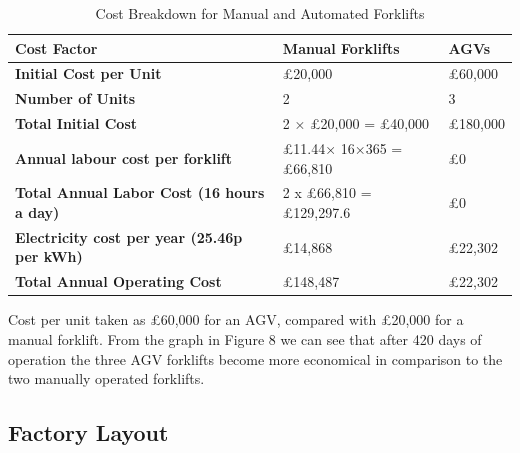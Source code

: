 \documentclass[12pt]{article}
\begin{document}
\begin{table}[htbp]
\centering
\begin{tabular}{|l|l|l|}
\hline
\textbf{Cost Factor}                   & \textbf{Manual Forklifts}           & \textbf{AGVs } \\ \hline
\textbf{Initial Cost per Unit}          & £20,000                             & £60,000                               \\ \hline
\textbf{Number of Units}                & 2                                    & 3                                     \\ \hline
\textbf{Total Initial Cost}             & 2 × £20,000 = £40,000               & £180,000                \\ \hline
\textbf{Annual labour cost per forklift }& £11.44× 16×365 = £66,810      & £0                                    \\ \hline
\textbf{Total Annual Labor Cost (16 hours a day)}        & 2 x £66,810 = £129,297.6    & £0                                    \\ \hline
 \textbf{Electricity cost per year (25.46p per kWh) } & £14,868&£22,302\\\hline  
 
\textbf{Total Annual Operating Cost}    & £148,487& £22,302\\ \hline
 
  
\end{tabular}

\caption{Cost Breakdown for Manual and Automated Forklifts}
\end{table}

\FloatBarrier
Cost per unit taken as £60,000 for an AGV, compared with £20,000 for a manual forklift. From the graph in Figure 8 we can see that after 420 days of operation the three AGV forklifts become more economical in comparison to the two manually operated forklifts. 
\FloatBarrier
\subsection{Factory Layout}
\end{document}
